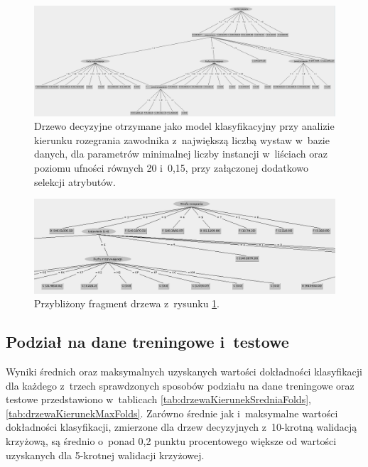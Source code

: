 \documentclass[a4paper,twoside,12pt]{book}
\begin{document}
\begin{figure}
\centering
\includegraphics[width=\columnwidth]{drzewoMM2085S}
\caption{Drzewo decyzyjne otrzymane jako model klasyfikacyjny przy analizie kierunku rozegrania zawodnika z~największą liczbą wystaw w~bazie danych, dla parametrów minimalnej liczby instancji w~liściach oraz poziomu ufności równych 20 i~0,15, przy załączonej dodatkowo selekcji atrybutów.}
\label{fig:drzewo3}
\end{figure}

\begin{figure}
\centering
\includegraphics[width=\columnwidth]{drzewoMM2085SP}
\caption{Przybliżony fragment drzewa z~rysunku \ref{fig:drzewo3}.}
\label{fig:drzewo4}
\end{figure}

\subsection{Podział na dane treningowe i~testowe}
\label{roz:podzial-danych}

Wyniki średnich oraz maksymalnych uzyskanych wartości dokładności klasyfikacji dla każdego z~trzech sprawdzonych sposobów podziału na dane treningowe oraz testowe przedstawiono w~tablicach \ref{tab:drzewaKierunekSredniaFolds}, \ref{tab:drzewaKierunekMaxFolds}. Zarówno średnie jak i~maksymalne wartości dokładności klasyfikacji, zmierzone dla drzew decyzyjnych z~10-krotną walidacją krzyżową, są średnio o~ponad 0,2 punktu procentowego większe od wartości uzyskanych dla 5-krotnej walidacji krzyżowej. 
\end{document}
